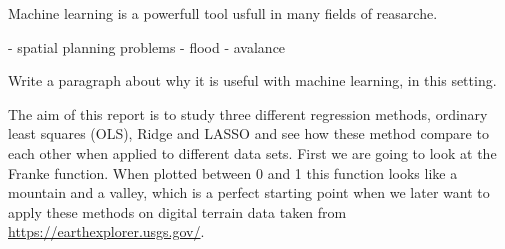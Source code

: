 \thispagestyle{plain}
\noindent Machine learning is a powerfull tool usfull in many fields of reasarche.

- spatial planning problems
- flood
- avalance

Write a paragraph about why it is useful with machine learning, in this setting.

\noindent The aim of this report is to study three different regression methods, ordinary least squares (OLS), Ridge and LASSO and see how these method compare to each other when applied to different data sets. First we are going to look at the Franke function. When plotted between 0 and 1 this function looks like a mountain and a valley, which is a perfect starting point when we later want to apply these methods on digital terrain data taken from \url{https://earthexplorer.usgs.gov/}.
